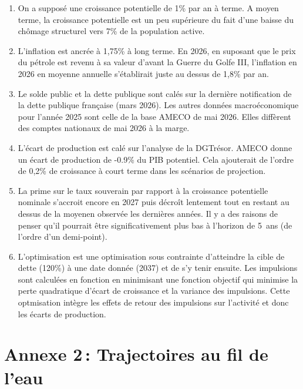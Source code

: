 \documentclass[
  french,
  9pt,
  a4paper,
  DIV=11,
  twoside=semi]{scrreprt}
\begin{document}
\begin{enumerate}
\def\labelenumi{\arabic{enumi}.}
\item
  On a supposé une croissance potentielle de 1\% par an à terme. A moyen
  terme, la croissance potentielle est un peu supérieure du fait d'une
  baisse du chômage structurel vers 7\% de la population active.
\item
  L'inflation est ancrée à 1,75\% à long terme. En 2026, en suposant que
  le prix du pétrole est revenu à sa valeur d'avant la Guerre du Golfe
  III, l'inflation en 2026 en moyenne annuelle s'établirait juste au
  dessus de 1,8\% par an.
\item
  Le solde public et la dette publique sont calés sur la dernière
  notification de la dette publique française (mars 2026). Les autres
  données macroéconomique pour l'année 2025 sont celle de la base AMECO
  de mai 2026. Elles diffèrent des comptes nationaux de mai 2026 à la
  marge.
\item
  L'écart de production est calé sur l'analyse de la DGTrésor. AMECO
  donne un écart de production de -0.9\% du PIB potentiel. Cela
  ajouterait de l'ordre de 0,2\% de croissance à court terme dans les
  scénarios de projection.
\item
  La prime sur le taux souverain par rapport à la croissance potentielle
  nominale s'accroit encore en 2027 puis décroît lentement tout en
  restant au dessus de la moyenen observée les dernières années. Il y a
  des raisons de penser qu'il pourrait être significativement plus bas à
  l'horizon de 5~ans (de l'ordre d'un demi-point).
\item
  L'optimisation est une optimisation sous contrainte d'atteindre la
  cible de dette (120\%) à une date donnée (2037) et de s'y tenir
  ensuite. Les impulsions sont calculées en fonction en minimisant une
  fonction objectif qui minimise la perte quadratique d'écart de
  croissance et la variance des impulsions. Cette optmisation intègre
  les effets de retour des impulsions sur l'activité et donc les écarts
  de production.
\end{enumerate}

\section*{Annexe 2\,: Trajectoires au fil de
l'eau}\label{annexe-2-trajectoires-au-fil-de-leau}
\end{document}
